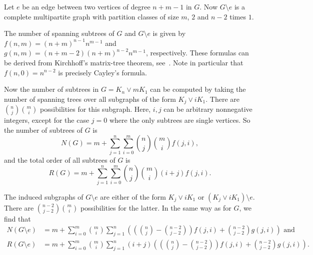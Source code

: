 \documentclass[11pt]{article}
\theoremstyle{definition}
\begin{document}

Let $e$ be an edge between two vertices of degree $n+m-1$ in $G$.
Now $G \setminus e$ is a complete multipartite graph with partition classes of size $m$, $2$ and $n-2$ times $1$.

The number of spanning subtrees of $G$ and $G \setminus e$ is given by $f(n,m)=(n+m)^{n-1}n^{m-1}$ and
$g(n,m)=(n+m-2)(n+m)^{n-2}n^{m-1}$, respectively. These formulas can be derived from Kirchhoff's matrix-tree theorem, see~\cite{Lewis99}. Note in particular that $f(n,0) = n^{n-2}$ is precisely Cayley's formula.



Now the number of subtrees in $G=K_n \vee m K_1$ can be computed by taking the number of spanning trees over all subgraphs of the form $K_{j} \vee i K_1.$
There are $\binom{n}{j}\binom{m}{i}$ possibilities for this subgraph.
Here, $i,j$ can be arbitrary nonnegative integers, except for the case $j=0$ where the only subtrees are single vertices.
So the number of subtrees of $G$ is
$$N(G)=m+\sum_{j=1}^n \sum_{i=0}^m \binom{n}{j}\binom{m}{i}f(j,i),$$
and the total order of all subtrees of $G$ is 
$$R(G)=m+\sum_{j=1}^n \sum_{i=0}^m \binom{n}{j}\binom{m}{i}(i+j)f(j,i). $$

The induced subgraphs of $G \setminus e$ are either of the form $K_{j} \vee i K_1$ or $(K_{j} \vee i K_1)\setminus e.$
There are $\binom{n-2}{j-2}\binom{m}{i}$ possibilities for the latter.
In the same way as for $G$, we find that 
\begin{align*}
    N(G \setminus e)&=m+\sum_{i=0}^m \binom{m}{i}\sum_{j=1}^n  \left( \left(\binom nj-\binom{n-2}{j-2}\right)f(j,i) + \binom{n-2}{j-2}g(j,i) \right)\mbox{ and } \\
    R(G \setminus e)&=m+\sum_{i=0}^m \binom{m}{i}\sum_{j=1}^n (i+j) \left( \left(\binom nj-\binom{n-2}{j-2}\right)f(j,i) + \binom{n-2}{j-2}g(j,i)\right). 
\end{align*}
\end{document}
